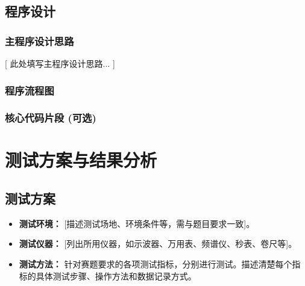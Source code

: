 \documentclass[zihao=-4,fontset=none]{ctexart}
\begin{document}
\subsection{程序设计}
\subsubsection{主程序设计思路}
    [ 此处填写主程序设计思路... ]

\subsubsection{程序流程图}
    
\subsubsection{核心代码片段 (可选)}

\section{测试方案与结果分析}
\subsection{测试方案}
    \begin{itemize}
        \item \textbf{测试环境：} [描述测试场地、环境条件等，需与题目要求一致]。
        \item \textbf{测试仪器：} [列出所用仪器，如示波器、万用表、频谱仪、秒表、卷尺等]。
        \item \textbf{测试方法：} 针对赛题要求的各项测试指标，分别进行测试。描述清楚每个指标的具体测试步骤、操作方法和数据记录方式。
    \end{itemize}
\end{document}

